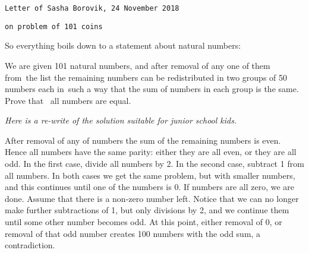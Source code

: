 

 \baselineskip=14pt
\def\vare {\varepsilon}
\def\A {{\bf A}}
\def\t {\tilde}
\def\a {\alpha}
\def\K {{\bf K}}
\def\N {{\bf N}}
\def\V {{\cal V}}
\def\s {{\sigma}}
\def\S {{\Sigma}}
\def\s {{\sigma}}
\def\p{\partial}
\def\vare{{\varepsilon}}
\def\Q {{\bf Q}}
\def\D {{\cal D}}
\def\G {{\Gamma}}
\def\C {{\bf C}}
\def\M {{\cal M}}
\def\Z {{\bf Z}}
\def\U  {{\cal U}}
\def\H {{\cal H}}
\def\R  {{\bf R}}
\def\E  {{\bf E}}
\def\l {\lambda}
\def\degree {{\bf {\rm degree}\,\,}}
\def \finish {${\,\,\vrule height1mm depth2mm width 8pt}$}
\def \m {\medskip}
\def\p {\partial}
\def\r {{\bf r}}
\def\v {{\bf v}}
\def\n {{\bf n}}
\def\t {{\bf t}}
\def\b {{\bf b}}
\def\e{{\bf e}}
\def\ac {{\bf a}}
\def \X   {{\bf X}}
\def \Y   {{\bf Y}}
\def \x   {{\bf x}}
\def \y   {{\bf y}}


{\tt Letter of Sasha Borovik, 24 November 2018}

{\tt on problem of 101 coins}

\m


  So everything boils down to a statement about
natural numbers:
 
{\it




We are given 101 natural numbers, and after removal of any one of them
from the list the remaining numbers can be redistributed in two groups of 50
numbers each in such a way that the sum of numbers in each group is the
same. Prove that  all  numbers are equal.

}

{\sl Here is a re-write of the solution suitable for junior
school kids.}



After removal of any of numbers the sum of the remaining
numbers is
even. Hence all numbers have the same parity: either they
are all
even, or they are all odd. In the first case, divide all
numbers by 2.
In the second case, subtract 1 from all numbers. In both
cases we get
the same problem, but with smaller numbers, and this
continues until
one of the numbers is 0. If numbers are all zero, we are
done. Assume
that there is a non-zero number left. Notice that we can
no longer
make further subtractions of 1, but only divisions by 2,
and we
continue them until some other number becomes odd. At this
point,
either removal of 0, or removal of that odd number creates
100 numbers
with the odd sum, a contradiction.


